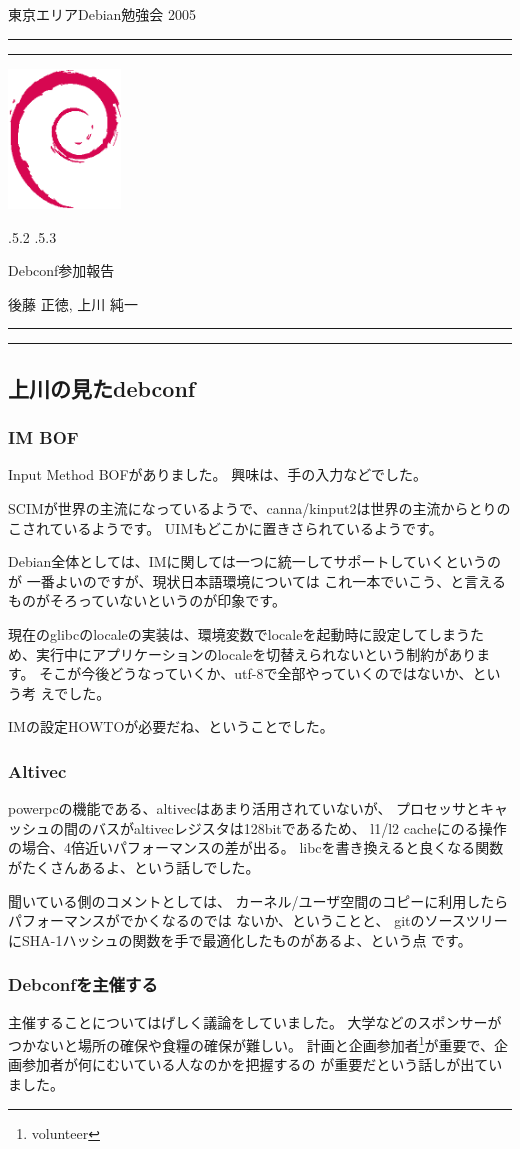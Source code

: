 \documentclass[mingoth]{jsarticle}
\makeatletter
\renewcommand{\section}{\@startsection{section}{1}{\z@}%
    {\Cvs \@plus.5\Cdp \@minus.2\Cdp}%
    {.5\Cvs \@plus.3\Cdp}%
    {\normalfont\Large\headfont\raggedright\centering}} %
\newcommand{\dancersection}[2]{%
\newpage
東京エリアDebian勉強会 2005
\hrule
\vspace{0.5mm}
\hrule
\hfill{}\includegraphics[width=3cm]{image200502/openlogo-nd.eps}\\
\vspace{-4cm}
\begin{center}
  \section{#1}
\end{center}
\hfill{}#2\hspace{3cm}\space\\
\hrule
\hrule
\vspace{1cm}
}
\makeatother
\begin{document}
\dancersection{Debconf参加報告}{後藤 正徳, 上川 純一}
\label{sec:gotom}
\subsection{上川の見たdebconf}
\subsubsection{IM BOF}
Input Method BOFがありました。
興味は、手の入力などでした。

SCIMが世界の主流になっているようで、canna/kinput2は世界の主流からとりの
こされているようです。
UIMもどこかに置きさられているようです。

Debian全体としては、IMに関しては一つに統一してサポートしていくというのが
一番よいのですが、現状日本語環境については
これ一本でいこう、と言えるものがそろっていないというのが印象です。

現在のglibcのlocaleの実装は、環境変数でlocaleを起動時に設定してしまうた
め、実行中にアプリケーションのlocaleを切替えられないという制約があります。
そこが今後どうなっていくか、utf-8で全部やっていくのではないか、という考
えでした。

IMの設定HOWTOが必要だね、ということでした。

\subsubsection{Altivec}

powerpcの機能である、altivecはあまり活用されていないが、
プロセッサとキャッシュの間のバスがaltivecレジスタは128bitであるため、 
l1/l2 cacheにのる操作の場合、4倍近いパフォーマンスの差が出る。
libcを書き換えると良くなる関数がたくさんあるよ、という話しでした。

聞いている側のコメントとしては、
カーネル/ユーザ空間のコピーに利用したらパフォーマンスがでかくなるのでは
ないか、ということと、
gitのソースツリーにSHA-1ハッシュの関数を手で最適化したものがあるよ、という点
です。

\subsubsection{Debconfを主催する}

主催することについてはげしく議論をしていました。
大学などのスポンサーがつかないと場所の確保や食糧の確保が難しい。
計画と企画参加者\footnote{volunteer}が重要で、企画参加者が何にむいている人なのかを把握するの
が重要だという話しが出ていました。
\end{document}
